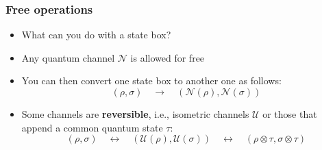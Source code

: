 \documentclass[usenames,dvipsnames,handout]{beamer}
\begin{document}
\begin{frame}
\frametitle{Free operations}

\begin{itemize}
\pause
\item What can you do with a state box?
\pause
\vspace{.1in}
\item Any quantum channel $\mathcal{N}$ is allowed for free

\pause
\vspace{.1in}
\item 
You can then convert one state box to another one as follows:
$$
(\rho, \sigma) \quad \rightarrow \quad (\mathcal{N}(\rho), \mathcal{N}(\sigma))
$$
 
 \pause
 \vspace{.1in}
\item Some channels are {\color{MidnightBlue}\textbf{reversible}}, i.e., isometric channels $\mathcal{U}$ or those that append a common quantum state $\tau$:
$$
(\rho, \sigma) \quad\leftrightarrow\quad (\mathcal{U}(\rho), \mathcal{U}(\sigma)) \quad\leftrightarrow\quad (\rho \otimes \tau, \sigma \otimes \tau)
$$
\end{itemize}

\end{frame}
\end{document}

